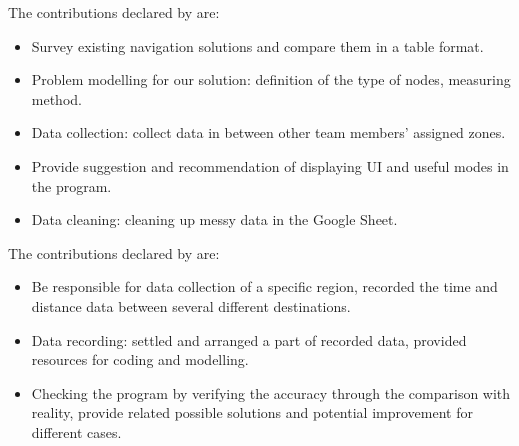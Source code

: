 \documentclass[a4paper,10pt]{amsart}
\begin{document}
The contributions declared by \textbf{\cBanh} are:
\begin{itemize}
    \item Survey existing navigation solutions and compare them in a table format.
    \item Problem modelling for our solution: definition of the type of nodes, measuring method.
    \item Data collection: collect data in between other team members' assigned zones.
    \item Provide suggestion and recommendation of displaying UI and useful modes in the program.
    \item Data cleaning: cleaning up messy data in the Google Sheet.
\end{itemize}

The contributions declared by \textbf{\sLiu} are:
\begin{itemize}
    \item Be responsible for data collection of a specific region, recorded the time and distance data between several different destinations.
    \item Data recording: settled and arranged a part of recorded data, provided resources for coding and modelling.
    \item Checking the program by verifying the accuracy through the comparison with reality, provide related possible solutions and potential improvement for different cases.
\end{itemize}
\end{document}
